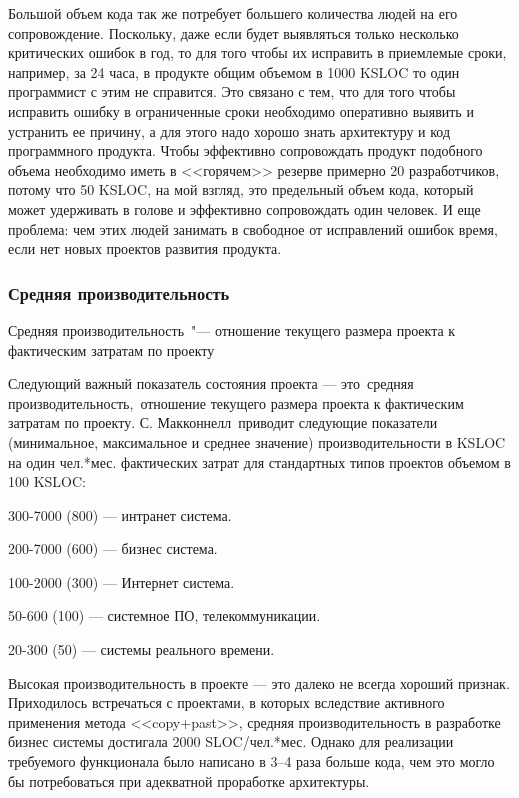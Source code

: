 \documentclass{../industrial-development}
\begin{document}
Большой объем кода так же потребует большего количества людей на его сопровождение. Поскольку, даже если будет выявляться только несколько критических ошибок в год, то для того чтобы их исправить в приемлемые сроки, например, за 24 часа, в продукте общим объемом в 1000 KSLOC то один программист с этим не справится. Это связано с тем, что для того чтобы исправить ошибку в ограниченные сроки необходимо оперативно выявить и устранить ее причину, а для этого надо хорошо знать архитектуру и код программного продукта. Чтобы эффективно сопровождать продукт подобного объема необходимо иметь в <<горячем>> резерве примерно 20 разработчиков, потому что 50 KSLOC, на мой взгляд, это предельный объем кода, который может удерживать в голове и эффективно сопровождать один человек. И еще проблема: чем этих людей занимать в свободное от исправлений ошибок время, если нет новых проектов развития продукта.

    \begin{frame} \frametitle{Средняя производительность}
        \begin{definition}
            \alert{Средняя производительность} "--- отношение текущего размера проекта к фактическим затратам по проекту
        \end{definition}
    \end{frame}
    \lecturenotes
Следующий важный показатель состояния проекта — это средняя производительность, отношение текущего размера проекта к фактическим затратам по проекту. С. Макконнелл приводит следующие показатели (минимальное, максимальное и среднее значение) производительности в KSLOC на один чел.*мес. фактических затрат для стандартных типов проектов объемом в 100 KSLOC:

300-7000 (800) — интранет система.

200-7000 (600) — бизнес система.

100-2000 (300) — Интернет система.

50-600 (100) — системное ПО, телекоммуникации.

20-300 (50) — системы реального времени.

Высокая производительность в проекте — это далеко не всегда хороший признак. Приходилось встречаться с проектами, в которых вследствие активного применения метода <<copy+past>>, средняя производительность в разработке бизнес системы достигала 2000 SLOC/чел.*мес. Однако для реализации требуемого функционала было написано в 3–4 раза больше кода, чем это могло бы потребоваться при адекватной проработке архитектуры.
\end{document}
